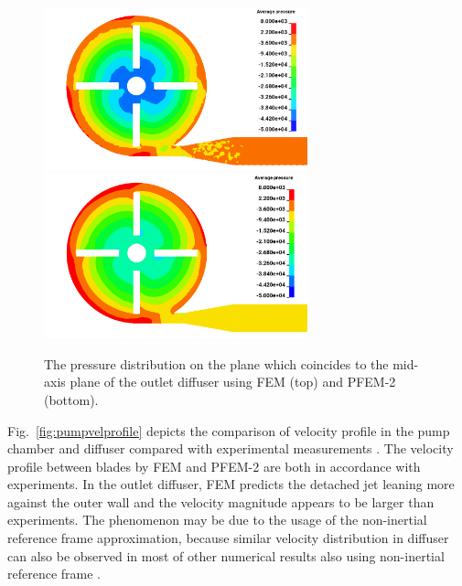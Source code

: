 \begin{figure}[htbp]
    \centering
    \includegraphics[width=3in]{imgs/nozzle_pump/pumppres_fem.png}\\
    \vspace{.5cm}
    \includegraphics[width=3in]{imgs/nozzle_pump/pumppres_pfem.png}
    \caption{The pressure distribution on the plane which coincides to the mid-axis plane of the outlet diffuser using FEM (top) and PFEM-2 (bottom).}
    \label{fig:pumppres}
\end{figure}

Fig.~\ref{fig:pumpvelprofile} depicts the comparison of velocity profile in the pump chamber and diffuser compared with experimental measurements \cite{mali_cfd}. The velocity profile between blades by FEM and PFEM-2 are both in accordance with experiments. In the outlet diffuser, FEM predicts the detached jet leaning more against the outer wall and the velocity magnitude appears to be larger than experiments. The phenomenon may be due to the usage of the non-inertial reference frame approximation, because similar velocity distribution in diffuser can also be observed in most of other numerical results also using non-inertial reference frame \cite{mali_cfd}.  
 
